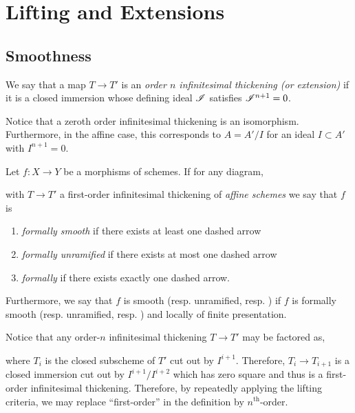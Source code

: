\documentclass[12pt]{article}
\begin{document}
\section{Lifting and Extensions}

\subsection{Smoothness}

\begin{defn}
We say that a map $T \to T'$ is an \textit{order $n$ infinitesimal thickening (or extension)} if it is a closed immersion whose defining ideal $\mathscr{I}$ satisfies $\mathscr{I}^{n+1} = 0$.
\end{defn}

\begin{rmk}
Notice that a zeroth order infinitesimal thickening is an isomorphism. Furthermore, in the affine case, this corresponds to $A = A' / I$ for an ideal $I \subset A'$ with $I^{n+1} = 0$.
\end{rmk}

\begin{defn}
Let $f : X \to Y$ be a morphisms of schemes. If for any diagram,
\begin{center}
\end{center}
with $T \to T'$ a first-order infinitesimal thickening of \textit{affine schemes} we say that $f$ is
\begin{enumerate}
\item \textit{formally smooth} if there exists at least one dashed arrow
\item \textit{formally unramified} if there exists at most one dashed arrow
\item \textit{formally \etale} if there exists exactly one dashed arrow.
\end{enumerate}
Furthermore, we say that $f$ is smooth (resp. unramified, resp. \etale) if $f$ is formally smooth (resp. unramified, resp. \etale) and locally of finite presentation.
\end{defn}

\begin{rmk}
Notice that any order-$n$ infinitesimal thickening $T \to T'$ may be factored as,
\begin{center}
\end{center}
where $T_i$ is the closed subscheme of $T'$ cut out by $I^{i+1}$. Therefore, $T_i \to T_{i+1}$ is a closed immersion cut out by $I^{i+1}/I^{i+2}$ which has zero square and thus is a first-order infinitesimal thickening. Therefore, by repeatedly applying the lifting criteria, we may replace ``first-order'' in the definition by $n^{\text{th}}$-order.
\end{rmk}
\end{document}
